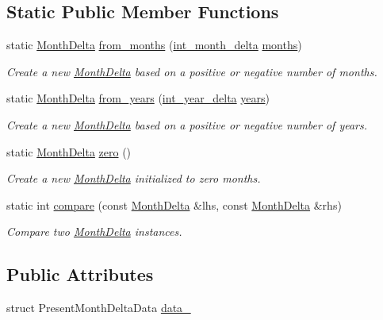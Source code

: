 \subsection*{Static Public Member Functions}
\begin{DoxyCompactItemize}
\item 
static \hyperlink{structMonthDelta}{Month\-Delta} \hyperlink{structMonthDelta_a3174797cbae9e936d9b3d6c8ea425574}{from\-\_\-months} (\hyperlink{types_8h_adc711c00c117528b40875ad0119c687f}{int\-\_\-month\-\_\-delta} \hyperlink{structMonthDelta_a47f7592328f434f4091a5b044d83976a}{months})
\begin{DoxyCompactList}\small\item\em Create a new \hyperlink{structMonthDelta}{Month\-Delta} based on a positive or negative number of months. \end{DoxyCompactList}\item 
static \hyperlink{structMonthDelta}{Month\-Delta} \hyperlink{structMonthDelta_a163938a57f97fb289a1a0288f1429554}{from\-\_\-years} (\hyperlink{types_8h_ad2a6eecbd190f1ae0327acdeaf596623}{int\-\_\-year\-\_\-delta} \hyperlink{structMonthDelta_abd1a36332a0347d39a9a7b7befceb6f5}{years})
\begin{DoxyCompactList}\small\item\em Create a new \hyperlink{structMonthDelta}{Month\-Delta} based on a positive or negative number of years. \end{DoxyCompactList}\item 
static \hyperlink{structMonthDelta}{Month\-Delta} \hyperlink{structMonthDelta_a847cb9c956c133957dbaffb32fb9bd15}{zero} ()
\begin{DoxyCompactList}\small\item\em Create a new \hyperlink{structMonthDelta}{Month\-Delta} initialized to zero months. \end{DoxyCompactList}\item 
static int \hyperlink{structMonthDelta_afb632f08f6278bcf7dfd5aef0cb12322}{compare} (const \hyperlink{structMonthDelta}{Month\-Delta} \&lhs, const \hyperlink{structMonthDelta}{Month\-Delta} \&rhs)
\begin{DoxyCompactList}\small\item\em Compare two \hyperlink{structMonthDelta}{Month\-Delta} instances. \end{DoxyCompactList}\end{DoxyCompactItemize}
\subsection*{Public Attributes}
\begin{DoxyCompactItemize}
\item 
struct Present\-Month\-Delta\-Data \hyperlink{structMonthDelta_a428f2591ca57d192424b298f95c87978}{data\-\_\-}
\end{DoxyCompactItemize}
